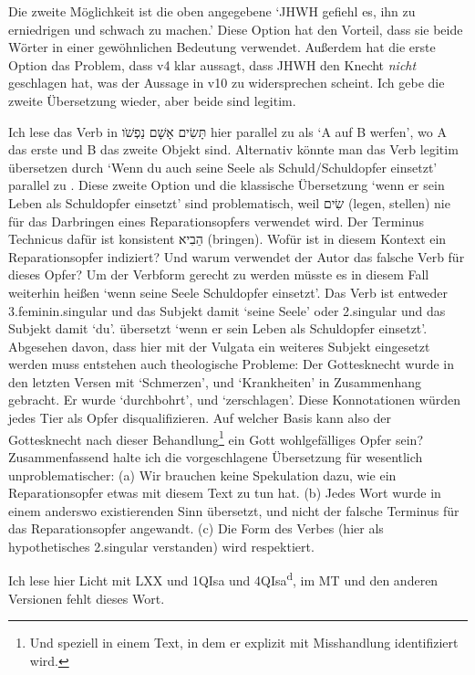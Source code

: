 \begin{description}
		Die zweite Möglichkeit ist die oben angegebene `JHWH gefiehl es, ihn zu erniedrigen und schwach zu machen.'
		Diese Option hat den Vorteil, dass sie beide Wörter in einer gewöhnlichen Bedeutung verwendet. Außerdem hat die erste Option das Problem,
		dass v4 klar aussagt, dass JHWH den Knecht \textit{nicht} geschlagen hat, was der Aussage in v10 zu widersprechen scheint.
		Ich gebe die zweite Übersetzung wieder, aber beide sind legitim.
	\item[Wenn du auch Schuld auf sein Leben wirfst]
		Ich lese das Verb in תָּשִׂים אָשָׁם נַפְשֹׁו hier parallel zu  als `A auf B werfen', wo A das erste und B das zweite Objekt sind.
		Alternativ könnte man das Verb legitim übersetzen durch `Wenn du auch seine Seele als Schuld/Schuldopfer einsetzt' parallel zu .
		Diese zweite Option und die klassische Übersetzung `wenn er sein Leben als Schuldopfer einsetzt' sind problematisch, weil שִׂים (legen, stellen) nie für das Darbringen eines Reparationsopfers verwendet wird.
		Der Terminus Technicus dafür ist konsistent הֵבִיא (bringen).
		Wofür ist in diesem Kontext ein Reparationsopfer indiziert? Und warum verwendet der Autor das falsche Verb für dieses Opfer?
		Um der Verbform gerecht zu werden müsste es in diesem Fall weiterhin heißen `wenn seine Seele Schuldopfer einsetzt'.
		Das Verb ist entweder 3.feminin.singular und das Subjekt damit `seine Seele' oder 2.singular und das Subjekt damit `du'.
		\Cite{elb} übersetzt `wenn er sein Leben als Schuldopfer einsetzt'.
		Abgesehen davon, dass hier mit der Vulgata ein weiteres Subjekt eingesetzt werden muss entstehen auch theologische Probleme:
		Der Gottesknecht wurde in den letzten Versen mit `Schmerzen', und `Krankheiten' in Zusammenhang gebracht.
		Er wurde `durchbohrt', und `zerschlagen'.
		Diese Konnotationen würden jedes Tier als Opfer disqualifizieren.
		Auf welcher Basis kann also der Gottesknecht nach dieser Behandlung\footnote{
		Und speziell in einem Text, in dem er explizit mit Misshandlung identifiziert wird.}
		ein Gott wohlgefälliges Opfer sein?
		Zusammenfassend halte ich die vorgeschlagene Übersetzung für wesentlich unproblematischer:
		(a) Wir brauchen keine Spekulation dazu, wie ein Reparationsopfer etwas mit diesem Text zu tun hat.
		(b) Jedes Wort wurde in einem anderswo existierenden Sinn übersetzt, und nicht der falsche Terminus für das Reparationsopfer angewandt.
		(c) Die Form des Verbes (hier als hypothetisches 2.singular verstanden) wird respektiert.
	\item[11 Licht] Ich lese hier Licht mit LXX und 1QIsa und 4QIsa\textsuperscript{d}, im MT und den anderen Versionen fehlt dieses Wort.

\end{description}
